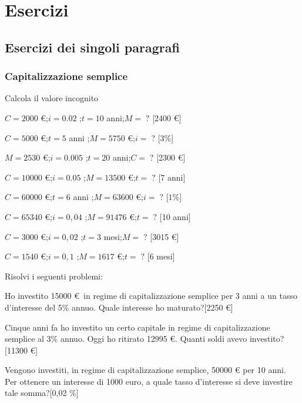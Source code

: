 
\section{Esercizi}

\subsection{Esercizi dei singoli paragrafi}

\subsubsection{Capitalizzazione semplice}

\begin{esercizio}
Calcola il valore incognito
 \begin{enumeratea}
 \item \(C = 2000\) \euro ;\quad \(i = 0.02\) ;\quad \(t = 10\) anni;\quad \(M=\;?\) \hfill [2400 \euro]
 \item \(C = 5000\) \euro ;\quad \(t = 5\) anni ;\quad \(M = 5750\) \euro;\quad \(i=\;?\) \hfill [\(3 \%\)]
 \item \(M = 2530\) \euro ;\quad \(i = 0.005\) ;\quad \(t = 20\) anni;\quad \(C=\;?\) \hfill [2300 \euro]
 \item \(C = 10000\) \euro ;\quad \(i = 0.05\) ;\quad \(M = 13500\) \euro;\quad \(t=\;?\) \hfill [7 anni]
 \item \(C = 60000\) \euro ;\quad \(t = 6\) anni ;\quad \(M = 63600\) \euro;\quad \(i=\;?\) \hfill [\(1 \%\)]
 \item \(C = 65340\) \euro ;\quad \(i = 0,04\) ;\quad \(M = 91476\) \euro;\quad \(t=\;?\) \hfill [10 anni]
 \item \(C = 3000\) \euro ;\quad \(i = 0,02\) ;\quad \(t = 3\) mesi;\quad \(M=\;?\) \hfill [3015 \euro]
 \item \(C = 1540\) \euro ;\quad \(i = 0,1\) ;\quad \(M = 1617\) \euro;\quad \(t=\;?\) \hfill [6 mesi]
 \end{enumeratea}
\end{esercizio}


\begin{esercizio}
Risolvi i seguenti problemi:
 \begin{enumeratea}
  \item Ho investito 15000 \euro\, in regime di capitalizzazione semplice per 3 anni a un tasso d'interesse del 5\% annuo. Quale interesse ho maturato?\hfill [2250 \euro]
  \item Cinque anni fa ho investito un certo capitale in regime di capitalizzazione semplice al 3\% annuo. Oggi ho ritirato 12995 \euro. Quanti soldi avevo investito?\hfill [11300 \euro]
  \item Vengono investiti, in regime di capitalizzazione semplice, 50000 \euro\; per 10 anni. Per ottenere un interesse di 1000 euro, a quale tasso d'interesse si deve investire tale somma?\hfill [0,02 \%]
 \end{enumeratea}
\end{esercizio}
